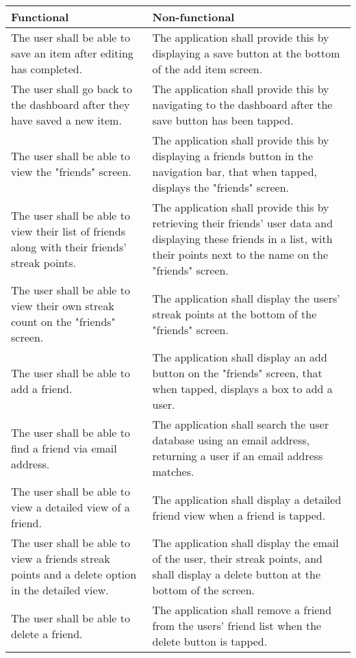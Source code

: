 \begin{table}[H]
    \centering
    \begin{tabular}{|p{7cm}|p{7cm}|}
        \hline
        Functional& Non-functional\\
        \hline
        The user shall be able to save an item after editing has completed.& The application shall provide this by displaying a save button at the bottom of the add item screen.\\
        \hline
        The user shall go back to the dashboard after they have saved a new item.& The application shall provide this by navigating to the dashboard after the save button has been tapped.\\
        \hline
        The user shall be able to view the "friends" screen.& The application shall provide this by displaying a friends button in the navigation bar, that when tapped, displays the "friends" screen.\\
        \hline
        The user shall be able to view their list of friends along with their friends' streak points.& The application shall provide this by retrieving their friends' user data and displaying these friends in a list, with their points next to the name on the "friends" screen.\\
        \hline
        The user shall be able to view their own streak count on the "friends" screen.& The application shall display the users' streak points at the bottom of the "friends" screen.\\
        \hline
        The user shall be able to add a friend.& The application shall display an add button on the "friends" screen, that when tapped, displays a box to add a user.\\
        \hline
        The user shall be able to find a friend via email address.& The application shall search the user database using an email address, returning a user if an email address matches.\\
        \hline
        The user shall be able to view a detailed view of a friend.& The application shall display a detailed friend view when a friend is tapped.\\
        \hline
        The user shall be able to view a friends streak points and a delete option in the detailed view.& The application shall display the email of the user, their streak points, and shall display a delete button at the bottom of the screen.\\
        \hline
        The user shall be able to delete a friend.& The application shall remove a friend from the users' friend list when the delete button is tapped.\\

\end{tabular}
\end{table}
